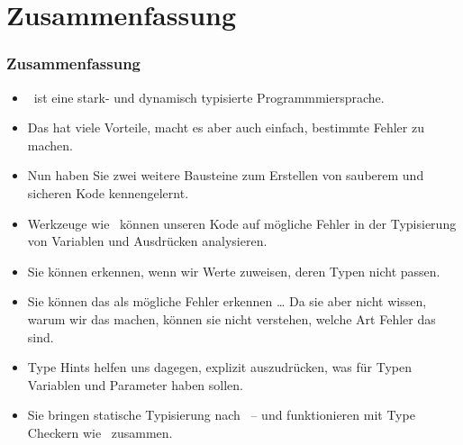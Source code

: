 \documentclass[aspectratio=169,mathserif,notheorems]{beamer}%
\begin{document}
\section{Zusammenfassung}%
%
\begin{frame}%
\frametitle{Zusammenfassung}%
\begin{itemize}%
%
\item \python\ ist eine stark- und dynamisch typisierte Programmmiersprache.%
%
\item<2-> Das hat viele Vorteile, macht es aber auch einfach, bestimmte Fehler zu machen.%
%
\item<3-> Nun haben Sie zwei weitere Bausteine zum Erstellen von sauberem und sicheren Kode kennengelernt.%
%
\item<4-> Werkzeuge wie \mypy\ können unseren Kode auf mögliche Fehler in der Typisierung von Variablen und Ausdrücken analysieren.%
%
\item<5-> Sie können erkennen, wenn wir Werte zuweisen, deren Typen nicht passen.%
%
\item<6-> Sie können das als mögliche Fehler erkennen {\dots} Da sie aber nicht wissen, warum wir das machen, können sie nicht verstehen, welche Art Fehler das sind.%
%
\item<7-> Type Hints helfen uns dagegen, explizit auszudrücken, was für Typen Variablen und Parameter haben sollen.%
%
\item<8-> Sie bringen statische Typisierung nach \python\ -- und funktionieren mit Type Checkern wie \mypy\ zusammen.%
\end{itemize}%
\end{frame}%
%
\endPresentation%
\end{document}
